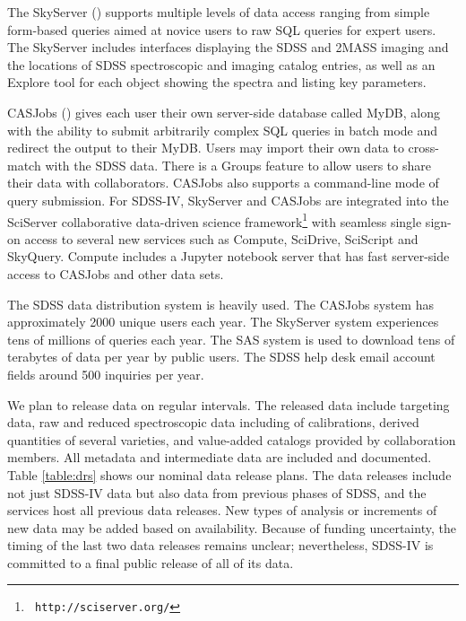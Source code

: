 The SkyServer (\citealt{szalay02a}) supports multiple levels of data
access ranging from simple form-based queries aimed at novice users to
raw SQL queries for expert users. The SkyServer includes interfaces
displaying the SDSS and 2MASS imaging and the locations of SDSS
spectroscopic and imaging catalog entries, as well as an Explore tool
for each object showing the spectra and listing key
parameters.

CASJobs (\citealt{li08b}) gives each user their own server-side
database called MyDB, along with the ability to submit arbitrarily
complex SQL queries in batch mode and redirect the output to their
MyDB.  Users may import their own data to cross-match with the SDSS
data. There is a Groups feature to allow users to share their data
with collaborators. CASJobs also supports a command-line mode of query
submission. For SDSS-IV, SkyServer and CASJobs are integrated into
the SciServer collaborative data-driven science framework\footnote{\tt
http://sciserver.org/} with seamless single sign-on access to several
new services such as Compute, SciDrive, SciScript and SkyQuery. Compute
includes a Jupyter notebook server that has fast server-side access to
CASJobs and other data sets.

The SDSS data distribution system is heavily used. The CASJobs system
has approximately 2000 unique users each year. The SkyServer system
experiences tens of millions of queries each year. The SAS system is
used to download tens of terabytes of data per year by public
users. The SDSS help desk email account fields around 500 inquiries
per year.

We plan to release data on regular intervals. The released data
include targeting data, raw and reduced spectroscopic data including
of calibrations, derived quantities of several varieties, and
value-added catalogs provided by collaboration members. All metadata
and intermediate data are included and documented. Table
\ref{table:drs} shows our nominal data release plans. The data
releases include not just SDSS-IV data but also data from previous
phases of SDSS, and the services host all previous data releases. New
types of analysis or increments of new data may be added based on
availability. Because of funding uncertainty, the timing of the last
two data releases remains unclear; nevertheless, SDSS-IV is committed
to a final public release of all of its data.
